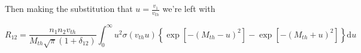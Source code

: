 \documentclass[11pt]{article}
\begin{document}
Then making the substitution that $u = \frac{v_1}{v_{th}}$ we're left with
	
\begin{equation}
	R_{12} = \frac{n_1 n_2 v_{th}}{M_{th} \sqrt{\pi} (1 + \delta_{12})} \int_0^\infty u^2 \sigma(v_{th} u) \left\lbrace \exp \left[ -\left( M_{th} -  u \right)^2 \right] - \exp \left[ -\left( M_{th} + u \right)^2 \right] \right\rbrace \mathrm{d} u
\end{equation}
\end{document}
